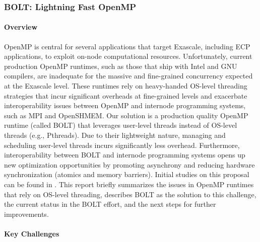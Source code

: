 \subsubsection{BOLT: Lightning Fast OpenMP}\label{subsubsect:bolt}

\paragraph{Overview}

OpenMP is central for several applications that target Exascale,
including ECP applications, to exploit on-node computational
resources.  Unfortunately, current production OpenMP runtimes, such as
those that ship with Intel and GNU compilers, are inadequate for the
massive and fine-grained concurrency expected at the Exascale level.
These runtimes rely on heavy-handed OS-level threading strategies that
incur significant overheads at fine-grained levels and exacerbate
interoperability issues between OpenMP and internode programming
systems, such as MPI and OpenSHMEM.  Our solution is a production
quality OpenMP runtime (called BOLT) that leverages user-level threads
instead of OS-level threads (e.g., Pthreads).  Due to their
lightweight nature, managing and scheduling user-level threads incurs
significantly less overhead.  Furthermore, interoperability between
BOLT and internode programming systems opens up new optimization
opportunities by promoting asynchrony and reducing hardware
synchronization (atomics and memory barriers).  Initial studies on
this proposal can be found in \cite{ccgrid, ppopp}.  This report
briefly summarizes the issues in OpenMP runtimes that rely on OS-level
threading, describes BOLT as the solution to this challenge, the
current status in the BOLT effort, and the next steps for further
improvements.

\paragraph{Key Challenges}

